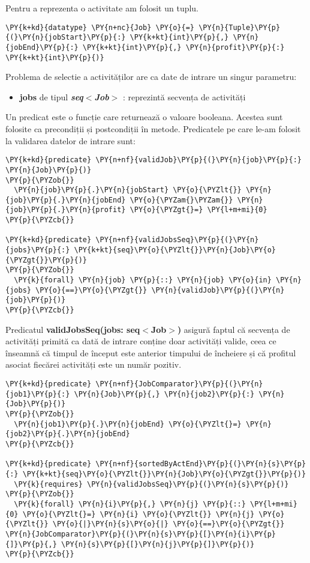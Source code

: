 Pentru a reprezenta o activitate am folosit un tuplu. 
\begin{Verbatim}[commandchars=\\\{\}, fontsize=\small]
\PY{k+kd}{datatype} \PY{n+nc}{Job} \PY{o}{=} \PY{n}{Tuple}\PY{p}{(}\PY{n}{jobStart}\PY{p}{:} \PY{k+kt}{int}\PY{p}{,} \PY{n}{jobEnd}\PY{p}{:} \PY{k+kt}{int}\PY{p}{,} \PY{n}{profit}\PY{p}{:} \PY{k+kt}{int}\PY{p}{)}
\end{Verbatim}
Problema de selectie a activităților are ca date de intrare un singur parametru:
\begin{itemize}
    \item \textbf{jobs} de tipul \textbf{\textit{seq$<$Job$>$}} : reprezintă secvența de activități 
\end{itemize}
Un predicat este o funcție care returnează o valoare booleana.\cite{DBLP:series/natosec/KoenigL12} Acestea sunt folosite ca precondiții și postcondiții în metode. Predicatele pe care le-am folosit la validarea datelor de intrare sunt:
\begin{Verbatim}[commandchars=\\\{\}, fontsize=\small]
\PY{k+kd}{predicate} \PY{n+nf}{validJob}\PY{p}{(}\PY{n}{job}\PY{p}{:} \PY{n}{Job}\PY{p}{)}
\PY{p}{\PYZob{}}
  \PY{n}{job}\PY{p}{.}\PY{n}{jobStart} \PY{o}{\PYZlt{}} \PY{n}{job}\PY{p}{.}\PY{n}{jobEnd} \PY{o}{\PYZam{}\PYZam{}} \PY{n}{job}\PY{p}{.}\PY{n}{profit} \PY{o}{\PYZgt{}=} \PY{l+m+mi}{0}
\PY{p}{\PYZcb{}}

\PY{k+kd}{predicate} \PY{n+nf}{validJobsSeq}\PY{p}{(}\PY{n}{jobs}\PY{p}{:} \PY{k+kt}{seq}\PY{o}{\PYZlt{}}\PY{n}{Job}\PY{o}{\PYZgt{}}\PY{p}{)}
\PY{p}{\PYZob{}}
  \PY{k}{forall} \PY{n}{job} \PY{p}{::} \PY{n}{job} \PY{o}{in} \PY{n}{jobs} \PY{o}{==}\PY{o}{\PYZgt{}} \PY{n}{validJob}\PY{p}{(}\PY{n}{job}\PY{p}{)}
\PY{p}{\PYZcb{}}
\end{Verbatim}
Predicatul \textbf{validJobsSeq(jobs: seq$<$Job$>$)} asigură faptul că secvența de activități primită  ca dată de intrare conține doar activități valide, ceea ce înseamnă că timpul de început este anterior timpului de încheiere și că profitul asociat fiecărei activități este un număr pozitiv.

\begin{Verbatim}[commandchars=\\\{\}, fontsize=\small]
\PY{k+kd}{predicate} \PY{n+nf}{JobComparator}\PY{p}{(}\PY{n}{job1}\PY{p}{:} \PY{n}{Job}\PY{p}{,} \PY{n}{job2}\PY{p}{:} \PY{n}{Job}\PY{p}{)}
\PY{p}{\PYZob{}}
  \PY{n}{job1}\PY{p}{.}\PY{n}{jobEnd} \PY{o}{\PYZlt{}=} \PY{n}{job2}\PY{p}{.}\PY{n}{jobEnd}
\PY{p}{\PYZcb{}}

\PY{k+kd}{predicate} \PY{n+nf}{sortedByActEnd}\PY{p}{(}\PY{n}{s}\PY{p}{:} \PY{k+kt}{seq}\PY{o}{\PYZlt{}}\PY{n}{Job}\PY{o}{\PYZgt{}}\PY{p}{)}
  \PY{k}{requires} \PY{n}{validJobsSeq}\PY{p}{(}\PY{n}{s}\PY{p}{)}
\PY{p}{\PYZob{}}
  \PY{k}{forall} \PY{n}{i}\PY{p}{,} \PY{n}{j} \PY{p}{::} \PY{l+m+mi}{0} \PY{o}{\PYZlt{}=} \PY{n}{i} \PY{o}{\PYZlt{}} \PY{n}{j} \PY{o}{\PYZlt{}} \PY{o}{|}\PY{n}{s}\PY{o}{|} \PY{o}{==}\PY{o}{\PYZgt{}} \PY{n}{JobComparator}\PY{p}{(}\PY{n}{s}\PY{p}{[}\PY{n}{i}\PY{p}{]}\PY{p}{,} \PY{n}{s}\PY{p}{[}\PY{n}{j}\PY{p}{]}\PY{p}{)}
\PY{p}{\PYZcb{}}
\end{Verbatim}

